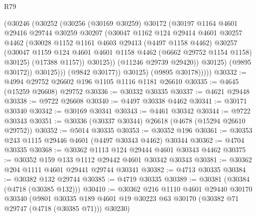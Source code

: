 \begin{lexlean}{R79}
\begin{coremodule}
                      (@30246
                        (@30252
                          (@30256
                            (@30169 @30259)
                            @30172
                            (@30197
                              @1164
                              @4601
                              @29416
                              @29744
                              @30259
                              @30207
                              (@30047
                                @1162
                                @124
                                @29414
                                @4601
                                @30257
                                @4462
                                (@30028
                                  @1152
                                  @1161
                                  @4603
                                  @29413
                                  (@4497 @1158 @4462)
                                  @30257
                                  (@30047
                                    @1159
                                    @124
                                    @4601
                                    @4601
                                    @1158
                                    @4462
                                    (@6662 @29752 @1154 @1158)
                                    @30125)
                                  (@17388 @1157))
                                @30125))
                            (@11246 @29739 @29420))
                          @30125)
                        (@9895 @30172))
                      @30125)))
                (@9842 @30177))
              @30125)
            (@9895 @30178)))))
@30332 := @4994 @29752 @26602 @196 @1105 @1116 @1181 @26610
@30335 := @4645 (@15259 @26608) @29752
@30336 := @30332 @30335
@30337 := @4621 @29448
@30338 := @9722 @26608
@30340 := @4497 @30338 @4462
@30341 := @30171 @30340
@30342 := @30169 @30341
@30343 := @4461 @30342
@30344 := @9722 @30343
@30351 := @30336 (@30337 @30344) @26618 (@4678 (@15294 @26610 @29752))
@30352 := @5014 @30335
@30353 := @30352 @196
@30361 := @30353 @243 @1115 @29446 @4601 (@4497 @30343 @4462) @30344
@30362 := @4704 @30335
@30368 := @30362 @1113 @124 @29444 @4601 @30343 @4462
@30375 := @30352 @159 @133 @1112 @29442 @4601 @30342 @30343
@30381 := @30362 @204 @1111 @4601 @29441 @29744 @30341
@30382 := @4713 @30335
@30384 := @30382 @132 @29744
@30385 := @4719 @30335
@30389 := @30381 (@30384 (@4718 (@30385 @132)))
@30410 := @30362
    @216
    @1110
    @4601
    @29440
    @30170
    @30340
    (@9801 @30335 @189 @4601 @19 @30223 @63 @30170 (@30382 @71 @29747 (@4718 (@30385 @71))) @30230)

\end{coremodule}
\end{lexlean}
